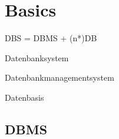 \section{Basics}
     \begin{multicols}{2}
        DBS = DBMS + (n*)DB
        \begin{description}
        \setlength{\itemsep}{0pt}    
            \item[DBS] Datenbanksystem
            \item[DBMS] Datenbankmanagementsystem
            \item[DB] Datenbasis
        \end{description}
     \end{multicols}
    \subsection {DBMS}
